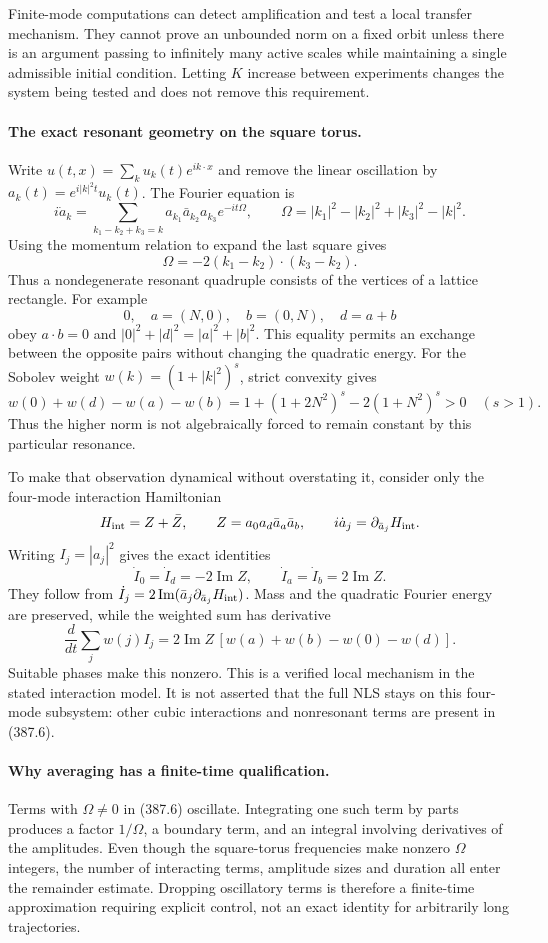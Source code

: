 \documentclass[11pt]{article}
\begin{document}
Finite-mode computations can detect amplification and test a local
transfer mechanism. They cannot prove an unbounded norm on a fixed
orbit unless there is an argument passing to infinitely many active
scales while maintaining a single admissible initial condition.
Letting $K$ increase between experiments changes the system being
tested and does not remove this requirement.

\paragraph{The exact resonant geometry on the square torus.}
Write $u(t,x)=\sum_k u_k(t)e^{ik\cdot x}$ and remove the linear
oscillation by $a_k(t)=e^{i|k|^2t}u_k(t)$. The Fourier equation is
\[
 i\dot a_k=\sum_{k_1-k_2+k_3=k}
 a_{k_1}\bar a_{k_2}a_{k_3}
 e^{-it\Omega},\qquad
 \Omega=|k_1|^2-|k_2|^2+|k_3|^2-|k|^2.
 \tag{387.6}
\]
Using the momentum relation to expand the last square gives
\[
 \Omega=-2(k_1-k_2)\cdot(k_3-k_2).
 \tag{387.7}
\]
Thus a nondegenerate resonant quadruple consists of the vertices
of a lattice rectangle. For example
\[
 0,\quad a=(N,0),\quad b=(0,N),\quad d=a+b
\]
obey $a\cdot b=0$ and
$|0|^2+|d|^2=|a|^2+|b|^2$. This equality permits an exchange
between the opposite pairs without changing the quadratic energy.
For the Sobolev weight $w(k)=(1+|k|^2)^s$, strict convexity gives
\[
 w(0)+w(d)-w(a)-w(b)
       =1+(1+2N^2)^s-2(1+N^2)^s>0
       \quad(s>1).
 \tag{387.8}
\]
Thus the higher norm is not algebraically forced to remain constant
by this particular resonance.

To make that observation dynamical without overstating it, consider
only the four-mode interaction Hamiltonian
\[
 H_{\rm int}=Z+\bar Z,\qquad
 Z=a_0a_d\bar a_a\bar a_b,
 \qquad i\dot a_j=\partial_{\bar a_j}H_{\rm int}.
\]
Writing $I_j=|a_j|^2$ gives the exact identities
\[
 \dot I_0=\dot I_d=-2\operatorname{Im}Z,\qquad
 \dot I_a=\dot I_b=2\operatorname{Im}Z.
 \tag{387.9}
\]
They follow from
$\dot I_j=2\operatorname{Im}(\bar a_j\partial_{\bar a_j}H_{\rm int})$.
Mass and the quadratic Fourier energy are preserved, while the
weighted sum has derivative
\[
 \frac{d}{dt}\sum_jw(j)I_j
 =2\operatorname{Im}Z\,[w(a)+w(b)-w(0)-w(d)].
 \tag{387.10}
\]
Suitable phases make this nonzero. This is a verified local mechanism
in the stated interaction model. It is not asserted that the full
NLS stays on this four-mode subsystem: other cubic interactions and
nonresonant terms are present in (387.6).

\paragraph{Why averaging has a finite-time qualification.}
Terms with $\Omega\ne0$ in (387.6) oscillate. Integrating one such
term by parts produces a factor $1/\Omega$, a boundary term, and
an integral involving derivatives of the amplitudes. Even though
the square-torus frequencies make nonzero $\Omega$ integers, the
number of interacting terms, amplitude sizes and duration all enter
the remainder estimate. Dropping oscillatory terms is therefore a
finite-time approximation requiring explicit control, not an exact
identity for arbitrarily long trajectories.
\end{document}
